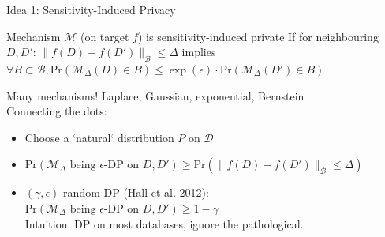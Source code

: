 \documentclass{beamer}
\newcommand{\cB}{\ensuremath{\mathcal{B}}\xspace}
\newcommand{\cD}{\ensuremath{\mathcal{D}}\xspace}
\newcommand{\mech}{\ensuremath{\mathcal{M}}\xspace}
\renewcommand{\Pr}[1]{\ensuremath{\mathrm{Pr}\left(#1\right)}}
\begin{document}
\begin{frame}{Idea 1: Sensitivity-Induced Privacy}
\begin{block}{Mechanism $\mech$ (on target $f$) is \alert{sensitivity-induced private}}
If for neighbouring $D,D'$: $\|f(D)-f(D')\|_\cB\leq\Delta$ implies $\forall B\subset\cB, \Pr{\mech_\Delta(D)\in B}\leq\exp(\epsilon)\cdot\Pr{\mech_\Delta(D')\in B}$
\end{block}


\alert{Many mechanisms!} Laplace, Gaussian, exponential, Bernstein\\[0.5em]

Connecting the dots:
\begin{itemize}
\item Choose a `natural` distribution $P$ on \cD
\item $\Pr{\mbox{$\mech_\Delta$ being $\epsilon$-DP on $D,D'$}} \geq \Pr{\|f(D)-f(D')\|_\cB\leq\Delta}$
\item \alert{$(\gamma,\epsilon)$-random DP} (Hall et al. 2012): \\
$\Pr{\mbox{$\mech_\Delta$ being $\epsilon$-DP on $D,D'$}} \geq 1 - \gamma$ \\
Intuition: DP on most databases, ignore the pathological.
\end{itemize}




\end{frame}
\end{document}

